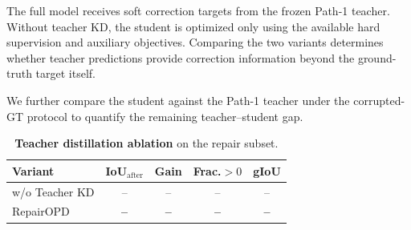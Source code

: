 The full model receives soft correction targets from the frozen Path-1 teacher.
Without teacher KD, the student is optimized only using the available hard supervision and auxiliary objectives.
Comparing the two variants determines whether teacher predictions provide correction information beyond the ground-truth target itself.

We further compare the student against the Path-1 teacher under the corrupted-GT protocol to quantify the remaining teacher--student gap.


\begin{table}[t]
    \centering
    \caption{
    \textbf{Teacher distillation ablation} on the repair subset.
    }
    \label{tab:ablation_teacher}
    \small
    \setlength{\tabcolsep}{4pt}
    \begin{tabular}{lcccc}
        \toprule
        \textbf{Variant}
        & IoU$_{\mathrm{after}}$
        & Gain
        & Frac.$\!>\!0$
        & gIoU \\
        \midrule
        w/o Teacher KD
        & --
        & --
        & --
        & -- \\

        RepairOPD
        & \textbf{--}
        & \textbf{--}
        & \textbf{--}
        & \textbf{--} \\
        \bottomrule
    \end{tabular}
\end{table}

